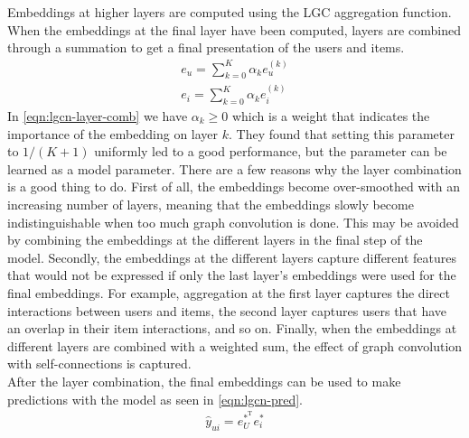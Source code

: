 Embeddings at higher layers are computed using the LGC aggregation function. 
When the embeddings at the final layer have been computed, layers are combined through a summation to get a final presentation of the users and items.
\begin{align}\label{eqn:lgcn-layer-comb}
    e_{u} = \sum_{k=0}^K \alpha_k e_{u}^{(k)} \nonumber\\
    e_{i} = \sum_{k=0}^K \alpha_k e_{i}^{(k)}
\end{align}
In \autoref{eqn:lgcn-layer-comb} we have $\alpha_k \geq 0$ which is a weight that indicates the importance of the embedding on layer $k$.
They found that setting this parameter to $1/(K+1)$ uniformly led to a good performance, but the parameter can be learned as a model parameter.
There are a few reasons why the layer combination is a good thing to do.
First of all, the embeddings become over-smoothed with an increasing number of layers, meaning that the embeddings slowly become indistinguishable when too much graph convolution is done.
This may be avoided by combining the embeddings at the different layers in the final step of the model.
Secondly, the embeddings at the different layers capture different features that would not be expressed if only the last layer's embeddings were used for the final embeddings.
For example, aggregation at the first layer captures the direct interactions between users and items, the second layer captures users that have an overlap in their item interactions, and so on.
Finally, when the embeddings at different layers are combined with a weighted sum, the effect of graph convolution with self-connections is captured.
\\
After the layer combination, the final embeddings can be used to make predictions with the model as seen in \autoref{eqn:lgcn-pred}.
\begin{align}\label{eqn:lgcn-pred}
    \hat{y}_{ui} = e_U^{*^\textrm{T}} e_i^*
\end{align}
